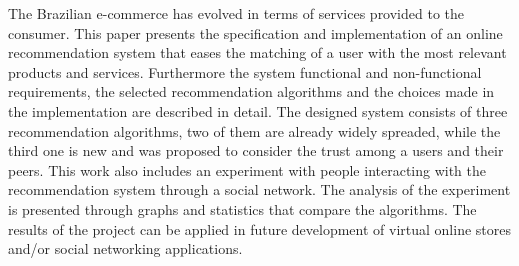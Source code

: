 The Brazilian e-commerce has evolved in terms of services provided to the consumer. This paper presents the specification and implementation of an online recommendation system that eases the matching of a user with the most relevant products and services. Furthermore the system functional and non-functional requirements, the selected recommendation algorithms and the choices made in the implementation are described in detail.
The designed system consists of three recommendation algorithms, two of them are already widely spreaded, while the third one is new and was proposed to consider the trust among a users and their peers.
This work also includes an experiment with people interacting with the recommendation system through a social network. The analysis of the experiment is presented through graphs and statistics that compare the algorithms.
The results of the project can be applied in future development of virtual online stores and/or social networking applications.